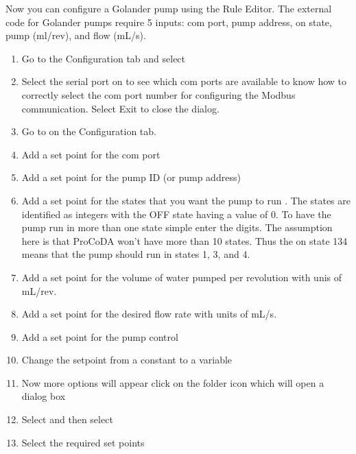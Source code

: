 \documentclass[letterpaper,10pt,english]{sphinxmanual}
\begin{document}
Now you can configure a Golander pump using the Rule Editor. The external code for Golander pumps require 5 inputs: com port, pump address, on state, pump (ml/rev), and flow (mL/s).
\begin{enumerate}
\item {} 
Go to the Configuration tab and select 

\item {} 
Select the serial port on  to see which com ports are available to know how to correctly select the com port number for configuring the Modbus communication. Select Exit to close the dialog.

\item {} 
Go to  on the Configuration tab.

\item {} 
Add a set point for the com port 

\item {} 
Add a set point for the pump ID (or pump address) 

\item {} 
Add a set point for the states that you want the pump to run . The states are identified as integers with the OFF state having a value of 0. To have the pump run in more than one state simple enter the digits. The assumption here is that ProCoDA won’t have more than 10 states. Thus the on state 134 means that the pump should run in states 1, 3, and 4.

\item {} 
Add a set point for the volume of water pumped per revolution with unis of mL/rev.

\item {} 
Add a set point for the desired flow rate with units of mL/s.

\item {} 
Add a set point for the pump control

\item {} 
Change the setpoint from a constant to a variable

\item {} 
Now more options will appear click on the folder icon which will open a dialog box

\item {} 
Select  and then select 

\item {} 
Select the required set points

\end{enumerate}
\end{document}
